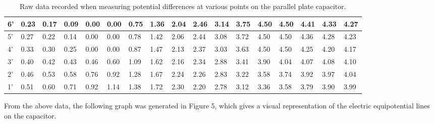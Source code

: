 \documentclass[letterpaper]{article}
\begin{document}
\begin{table}[H]
{\begin{tabular}{l|l|l|l|l|l|l|l|l|l|l|l|l|l|l|l|l|}
6' & 0.23 & 0.17 & 0.09 & 0.00 & 0.00 & 0.75 & 1.36 & 2.04 & 2.46 & 3.14 & 3.75 & 4.50 & 4.50 & 4.41 & 4.33 & 4.27 \\ \hline
5' & 0.27 & 0.22 & 0.14 & 0.00 & 0.00 & 0.78 & 1.42 & 2.06 & 2.44 & 3.08 & 3.72 & 4.50 & 4.50 & 4.36 & 4.28 & 4.23 \\ \hline
4' & 0.33 & 0.30 & 0.25 & 0.00 & 0.00 & 0.87 & 1.47 & 2.13 & 2.37 & 3.03 & 3.63 & 4.50 & 4.50 & 4.25 & 4.20 & 4.17 \\ \hline
3' & 0.40 & 0.42 & 0.43 & 0.46 & 0.60 & 1.09 & 1.62 & 2.16 & 2.34 & 2.88 & 3.41 & 3.90 & 4.04 & 4.07 & 4.08 & 4.10 \\ \hline
2' & 0.46 & 0.53 & 0.58 & 0.76 & 0.92 & 1.28 & 1.67 & 2.24 & 2.26 & 2.83 & 3.22 & 3.58 & 3.74 & 3.92 & 3.97 & 4.04 \\ \hline
1' & 0.51 & 0.60 & 0.71 & 0.92 & 1.14 & 1.38 & 1.72 & 2.30 & 2.20 & 2.78 & 3.12 & 3.36 & 3.58 & 3.79 & 3.90 & 3.99 \\ \hline
\end{tabular}%
}
\caption{Raw data recorded when measuring potential differences at various points on the parallel plate capacitor.}
\end{table}
\newpage
From the above data, the following graph was generated in Figure 5, which gives a visual representation of the electric
equipotential lines on the capacitor.
\end{document}
